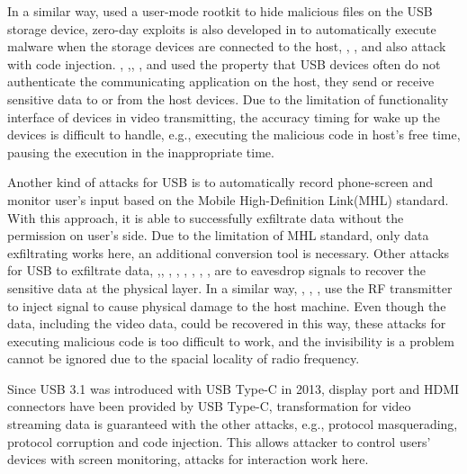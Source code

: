 In a similar way, \cite{duqu} used a user-mode rootkit to hide malicious files on the USB storage device, zero-day exploits is also developed in \cite{zero-day} to automatically execute malware when the storage devices are connected to the host, \cite{brain}, \cite{stuxnet}, \cite{conficker} and \cite{flame} also attack with code injection. \cite{webcam}, \cite{malware},\cite{audioextraction}, \cite{usbee}, and \cite{turnip} used the property that USB devices often do not authenticate the communicating application on the host, they send or receive sensitive data to or from the host devices. Due to the limitation of functionality interface of devices in video transmitting, the accuracy timing for wake up the devices is difficult to handle, e.g., executing the malicious code in host's free time, pausing the execution in the inappropriate time. 

Another kind of attacks for USB \cite{JFC} is to automatically record phone-screen and monitor user's input based on  the Mobile High-Definition Link(MHL) standard. With this approach, it is able to successfully exfiltrate data without the permission on user's side. Due to the limitation of MHL standard, only data exfiltrating works here, an additional conversion tool is necessary. Other attacks for USB to exfiltrate data\cite{smartphone}, \cite{poweremi},\cite{revealing}, \cite{su2017usb}, \cite{usbgpslocator}, \cite{bates2014leveraging}, \cite{badusbhub}, \cite{usbfinger}, \cite{side}, \cite{usbdriver} are to eavesdrop signals to recover the sensitive data at the physical layer. In a similar way, \cite{usbkiller}, \cite{cable}, \cite{usbee}, \cite{turnip} use the RF transmitter to inject signal to cause physical damage to the host machine. Even though the data, including the video data, could be recovered in this way, these attacks for executing malicious code is too difficult to work, and the invisibility is a problem cannot be ignored due to the spacial locality of radio frequency. 


Since USB 3.1 was introduced with USB Type-C in 2013, display port and HDMI connectors have been provided by USB Type-C, transformation for video streaming data is guaranteed with the other attacks, e.g., protocol masquerading,  protocol corruption and code injection. This allows attacker to control users' devices with screen monitoring, attacks for interaction work here.



\\


